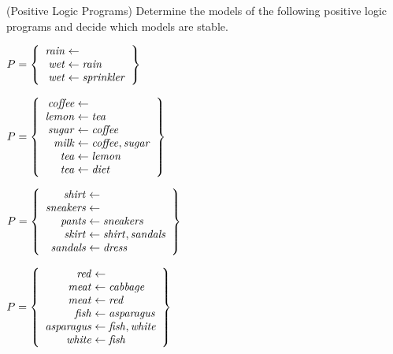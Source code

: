 \begin{Uebung}{(Positive Logic Programs)}
Determine the models of the following positive logic programs
and decide which models are stable.

\begin{UList}
\item
\(
P =
\left\{
\begin{array}{r@{{}\leftarrow{}}l}
\mathit{rain}
\\
\mathit{wet} & \mathit{rain}
\\
\mathit{wet} & \mathit{sprinkler}
\end{array}
\right\}
\)
\item
\(
P =
\left\{
\begin{array}{r@{{}\leftarrow{}}l}
\mathit{coffee}
\\
\mathit{lemon} & \mathit{tea}
\\
\mathit{sugar} & \mathit{coffee}
\\
\mathit{milk}  & \mathit{coffee}, \mathit{sugar}
\\
\mathit{tea}   & \mathit{lemon}
\\
\mathit{tea}   & \mathit{diet}
\end{array}
\right\}
\)
\item
\(
P =
\left\{
\begin{array}{r@{{}\leftarrow{}}l}
\mathit{shirt}
\\
\mathit{sneakers}
\\
\mathit{pants}   & \mathit{sneakers}
\\
\mathit{skirt}   & \mathit{shirt}, \mathit{sandals}
\\
\mathit{sandals} & \mathit{dress}
\end{array}
\right\}
\)
\item
\(
P =
\left\{
\begin{array}{r@{{}\leftarrow{}}l}
\mathit{red}
\\
\mathit{meat}      & \mathit{cabbage}
\\
\mathit{meat}      & \mathit{red}
\\
\mathit{fish}      & \mathit{asparagus}
\\
\mathit{asparagus} & \mathit{fish}, \mathit{white}
\\
\mathit{white}     & \mathit{fish} %
\end{array}
\right\}
\)
\end{UList}
\end{Uebung}

